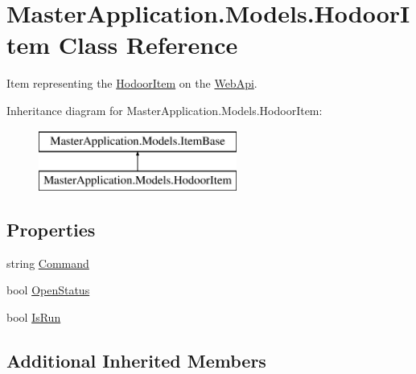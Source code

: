 \hypertarget{class_master_application_1_1_models_1_1_hodoor_item}{}\section{Master\+Application.\+Models.\+Hodoor\+Item Class Reference}
\label{class_master_application_1_1_models_1_1_hodoor_item}


Item representing the \mbox{\hyperlink{class_master_application_1_1_models_1_1_hodoor_item}{Hodoor\+Item}} on the \mbox{\hyperlink{namespace_web_api}{Web\+Api}}.  


Inheritance diagram for Master\+Application.\+Models.\+Hodoor\+Item\+:\begin{figure}[H]
\begin{center}
\leavevmode
\includegraphics[height=2.000000cm]{class_master_application_1_1_models_1_1_hodoor_item}
\end{center}
\end{figure}
\subsection*{Properties}
\begin{DoxyCompactItemize}
\item 
string \mbox{\hyperlink{class_master_application_1_1_models_1_1_hodoor_item_a1edfbeb1db891b3931ec5d046ac35468}{Command}}
\item 
bool \mbox{\hyperlink{class_master_application_1_1_models_1_1_hodoor_item_ad95169eb7989daf2c856ab4f56e455a4}{Open\+Status}}
\item 
bool \mbox{\hyperlink{class_master_application_1_1_models_1_1_hodoor_item_af8af2476575e11b28e3aa7bbbc4de8f1}{Is\+Run}}
\end{DoxyCompactItemize}
\subsection*{Additional Inherited Members}


